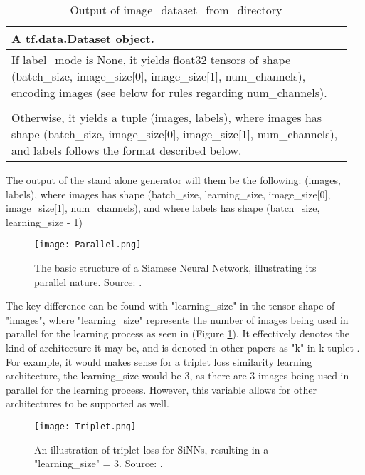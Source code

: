 \documentclass[
	letterpaper, %
	10pt, %
	unnumberedsections, %
	twoside, %
]{LTJournalArticle}
\begin{document}
\begin{table}[hbt!] %
	\caption{Output of image\_dataset\_from\_directory}
	\centering
	\begin{tabular}{p{0.95\linewidth}}
		\toprule
		A tf.data.Dataset object. \\
		\midrule
        If label\_mode is None, it yields float32 tensors of shape (batch\_size, image\_size[0], image\_size[1], num\_channels), encoding images (see below for rules regarding num\_channels). \\
        \\
        Otherwise, it yields a tuple (images, labels), where images has shape (batch\_size, image\_size[0], image\_size[1], num\_channels), and labels follows the format described below. \\
		\bottomrule
	\end{tabular}
	\label{tab:output}
\end{table}

The output of the stand alone generator will them be the following: (images, labels), where images has shape (batch\_size, learning\_size, image\_size[0], image\_size[1], num\_channels), and where labels has shape (batch\_size, learning\_size - 1)

\begin{figure} %
	\texttt{[image: Parallel.png]}
	\caption{The basic structure of a Siamese Neural Network, illustrating its parallel nature. Source: \autocite{craeymeersch}.}
	\label{fig:parallel}
\end{figure}

The key difference can be found with "learning\_size" in the tensor shape of "images", where "learning\_size" represents the number of images being used in parallel for the learning process as seen in (Figure \ref{fig:parallel}). It effectively denotes the kind of architecture it may be, and is denoted in other papers as "k" in k-tuplet \autocite{li_yu_fu_fang_heng}. For example, it would makes sense for a triplet loss similarity learning architecture, the learning\_size would be 3, as there are 3 images being used in parallel for the learning process. However, this variable allows for other architectures to be supported as well. 

\begin{figure} %
	\texttt{[image: Triplet.png]}
	\caption{An illustration of triplet loss for SiNNs, resulting in a "learning\_size" = 3. Source: \autocite{craeymeersch}.}
	\label{fig:triplet}
\end{figure}
\end{document}
